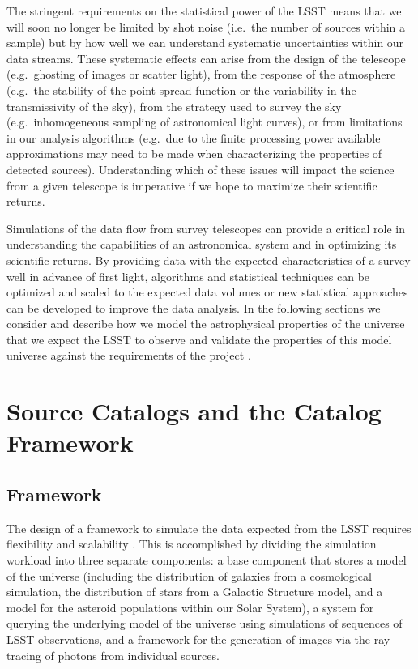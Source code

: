 \documentclass[11pt]{article}
\begin{document}
The stringent requirements on the statistical power of the LSST means
that we will soon no longer be limited by shot noise (i.e.\ the number
of sources within a sample) but by how well we can understand
systematic uncertainties within our data streams. These systematic
effects can arise from the design of the telescope (e.g.\ ghosting of
images or scatter light), from the response of the atmosphere (e.g.\
the stability of the point-spread-function or the variability in the
transmissivity of the sky), from the strategy used to survey the sky
(e.g.\ inhomogeneous sampling of astronomical light curves), or from
limitations in our analysis algorithms (e.g.\ due to the finite
processing power available approximations may need to be made when
characterizing the properties of detected sources). Understanding
which of these issues will impact the science from a given telescope
is imperative if we hope to maximize their scientific returns.

Simulations of the data flow from survey telescopes can provide a
critical role in understanding the capabilities of an astronomical
system and in optimizing its scientific returns. By providing data
with the expected characteristics of a survey well in advance of first
light, algorithms and statistical techniques can be optimized and
scaled to the expected data volumes or new statistical approaches can
be developed to improve the data analysis.  In the following sections
we consider and describe how we model the astrophysical properties of
the universe that we expect the LSST to observe and validate the
properties of this model universe against the requirements of the
project \citep{requirements}.

\section{Source Catalogs and the Catalog Framework}

\subsection{Framework}

The design of a framework to simulate the data expected from the LSST
requires flexibility and scalability \citep{connolly10}.
This is accomplished by dividing the simulation workload into three
separate components: a base component that stores a model of the
universe (including the distribution of galaxies from a cosmological
simulation, the distribution of stars from a Galactic Structure model,
and a model for the asteroid populations within our Solar System), a
system for querying the underlying model of the universe using
simulations of sequences of LSST observations, and a framework for the
generation of images via the ray-tracing of photons from individual
sources.
\end{document}
